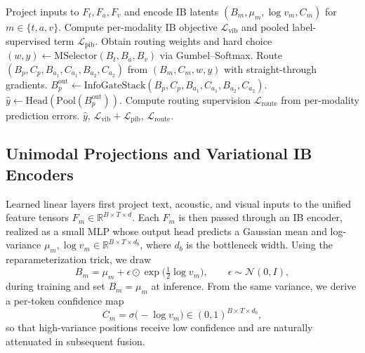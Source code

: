 \documentclass[11pt]{article}
\begin{document}
\begin{algorithm}[t]
  \caption{InfoGate forward pass on a single batch.}
  \label{alg:forward}
  \begin{algorithmic}[1]
    \STATE Project inputs to $F_t,F_a,F_v$ and encode IB latents
      $(B_m,\mu_m,\log v_m,C_m)$ for $m\in\{t,a,v\}$.
    \STATE Compute per-modality IB objective
      $\mathcal{L}_{\mathrm{vib}}$ and pooled label-supervised term
      $\mathcal{L}_{\mathrm{pib}}$.
    \STATE Obtain routing weights and hard choice
      $(w,y)\leftarrow \mathrm{MSelector}(B_t,B_a,B_v)$ via Gumbel--Softmax.
    \STATE Route $(B_p,C_p,B_{a_1},C_{a_1},B_{a_2},C_{a_2})$ from
      $(B_m,C_m,w,y)$ with straight-through gradients.
    \STATE $B_p^{\mathrm{out}} \leftarrow
      \mathrm{InfoGateStack}(B_p,C_p,B_{a_1},C_{a_1},B_{a_2},C_{a_2})$.
    \STATE $\hat{y} \leftarrow \mathrm{Head}(\mathrm{Pool}(B_p^{\mathrm{out}}))$.
      \STATE Compute routing supervision
        $\mathcal{L}_{\mathrm{route}}$ from per-modality prediction errors.
    \ENDIF
    \RETURN $\hat{y}$,
      $\mathcal{L}_{\mathrm{vib}}+\mathcal{L}_{\mathrm{pib}}$,
      $\mathcal{L}_{\mathrm{route}}$.
  \end{algorithmic}
\end{algorithm}

\subsection{Unimodal Projections and Variational IB Encoders}
\label{sec:method-ibenc}
Learned linear layers first project text, acoustic, and visual inputs to the
unified feature tensors $F_m \in \mathbb{R}^{B \times T \times d}$.
Each $F_m$ is then passed through an IB encoder, realized as a small MLP whose
output head predicts a Gaussian mean and log-variance
$\mu_m, \log v_m \in \mathbb{R}^{B \times T \times d_b}$, where $d_b$ is the
bottleneck width. Using the reparameterization trick, we draw
\begin{equation}
  B_m = \mu_m + \epsilon \odot \exp\!\bigl(\tfrac{1}{2}\log v_m\bigr),
  \qquad
  \epsilon \sim \mathcal{N}(0, I),
\end{equation}
during training and set $B_m = \mu_m$ at inference.
From the same variance, we derive a per-token confidence map
\begin{equation}
  C_m = \sigma\!\bigl(-\log v_m\bigr) \in (0, 1)^{B \times T \times d_b},
\end{equation}
so that high-variance positions receive low confidence and are naturally
attenuated in subsequent fusion.
\end{document}

